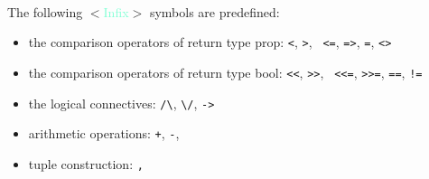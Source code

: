 \documentclass[a4paper]{scrreprt}
\newcommand{\likecat}[1]{$<$\textcolor{Aquamarine}{#1}$>$}
\newcommand{\catdef}[1]{\label{#1}\likecat{#1}}
\begin{document}
\paragraph{}
The following \catdef{Infix} symbols are predefined: 
  \begin{itemize}
  \item the comparison operators of return type prop: {\tt <}, {\tt >}, {\tt
  <=}, {\tt =>}, {\tt =}, {\tt <>}
  \item the comparison operators of return type bool: {\tt <<}, {\tt >>}, {\tt
  <<=}, {\tt >>=}, {\tt ==}, {\tt !=}
  \item the logical connectives: \verb|/\|, \verb|\/|, {\tt ->}
  \item arithmetic operations: {\tt +}, {\tt -}, {\tt *}
  \item tuple construction: {\tt ,}
  \end{itemize}
\end{document}
